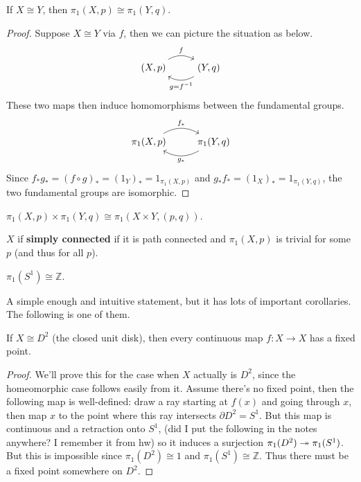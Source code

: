 \documentclass[twoside,10pt]{report}
\begin{document}
\begin{thrm}[]
	If $X \cong Y$, then $\pi_1(X,p) \cong \pi_1(Y,q)$.
\end{thrm}
\begin{proof}
	Suppose $X \cong Y$ via $f$, then we can picture the situation as below.
	\[
	\begin{tikzcd}
		(X,p)\arrow[r,"f",bend left]&(Y,q)\arrow[l,"g=f^{-1}",bend left]
	\end{tikzcd}
	\] 
	These two maps then induce homomorphisms between the fundamental groups.
	\[
        \begin{tikzcd}
                \pi_1(X,p)\arrow[r,"f_{*}",bend left]&\pi_1(Y,q)\arrow[l,"g_{*}",bend left]
        \end{tikzcd}
        \]
	Since $f_{*}g_{*}=(f\circ g)_{*}=(1_{Y})_{*}=1_{\pi_1(X,p)}$ and $g_{*}f_{*}=(1_{X})_{*}=1_{\pi_1(Y,q)}$, the two fundamental groups are isomorphic.
\end{proof}

\begin{prop}
	$\pi_1(X,p) \times \pi_1(Y,q) \cong \pi_1(X\times Y,(p,q))$.
\end{prop}

\begin{defn}[]
	$X$ if \textbf{simply connected} if it is path connected and $\pi_1(X,p)$ is trivial for some $p$ (and thus for all $p$).
\end{defn}

\begin{thrm}[]
	$\pi_1(S^{1})\cong \mathbb{Z}$.
\end{thrm}
A simple enough and intuitive statement, but it has lots of important corollaries. The following is one of them.

\begin{thrm}
	If $X \cong D^{2}$ (the closed unit disk), then every continuous map $f:X\to X$ has a fixed point.
\end{thrm}
\begin{proof}
	We'll prove this for the case when $X$ actually is $D^{2}$, since the homeomorphic case follows easily from it. Assume there's no fixed point, then the following map is well-defined: draw a ray starting at $f(x)$ and going through $x$, then map $x$ to the point where this ray intersects $\partial D^2 = S^{1}$. But this map is continuous and a retraction onto $S^{1}$, {\color{red}(did I put the following in the notes anywhere? I remember it from hw)} so it induces a surjection $\pi_1(D^{2}) \twoheadrightarrow \pi_1(S^{1})$. But this is impossible since $\pi_1(D^{2}) \cong 1$ and $\pi_1(S^{1}) \cong \mathbb{Z}$. Thus there must be a fixed point somewhere on $D^{2}$.
\end{proof}
\end{document}
